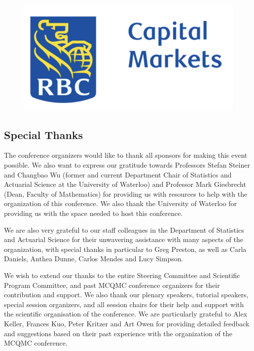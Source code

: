 \begin{figure}[ht]
\hfill
\includegraphics[scale =0.5]{RBC.png}
\end{figure}

\bigskip
\bigskip
\bigskip
% 

\clearpage
\subsection{Special Thanks}

The conference organizers would like to thank all sponsors for making this
event possible. We also want to express our gratitude towards 
Professors Stefan Steiner and Changbao Wu (former and current Department Chair of Statistics and Actuarial Science at the University of Waterloo) and Professor Mark Giesbrecht (Dean, Faculty of Mathematics) for providing us with resources to help with the organization of this conference. We also thank the University of Waterloo for providing us with the space needed to host this conference.


We are also very grateful to our staff colleagues in the Department of Statistics and Actuarial Science for their unwavering assistance with many aspects of the organization, with special thanks in particular to Greg Preston, as well as Carla Daniels, Anthea Dunne, Carlos Mendes and Lucy Simpson.


We wish to extend our thanks to the entire Steering Committee and
Scientific Program Committee, and past MCQMC conference organizers for their
contribution and support. We also thank our plenary speakers, tutorial
speakers, special session organizers, and all session chairs for their
help and support with the scientific organisation of the conference. We are particularly grateful to Alex Keller, Frances Kuo, Peter Kritzer and  Art Owen for providing detailed feedback and suggestions based on their past experience with the organization of the MCQMC conference.

